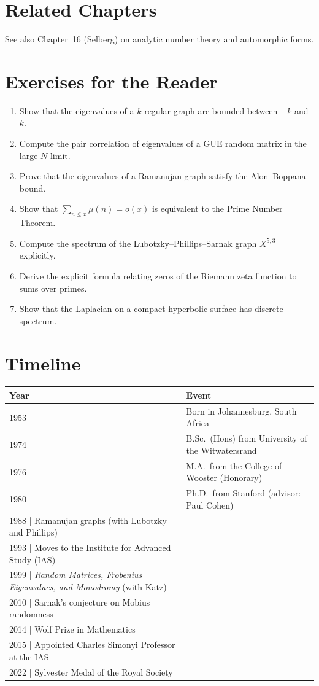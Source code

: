 \section{Related Chapters}
See also Chapter~16 (Selberg) on analytic number theory and automorphic forms.

\section*{Exercises for the Reader}

\begin{enumerate}
    \item [B] Show that the eigenvalues of a $k$-regular graph are bounded between $-k$ and $k$.
    \item [I] Compute the pair correlation of eigenvalues of a GUE random matrix in the large $N$ limit.
    \item [I] Prove that the eigenvalues of a Ramanujan graph satisfy the Alon--Boppana bound.
    \item [I] Show that $\sum_{n \leq x} \mu(n) = o(x)$ is equivalent to the Prime Number Theorem.
    \item [A] Compute the spectrum of the Lubotzky--Phillips--Sarnak graph $X^{5,3}$ explicitly.
    \item [I] Derive the explicit formula relating zeros of the Riemann zeta function to sums over primes.
    \item [I] Show that the Laplacian on a compact hyperbolic surface has discrete spectrum.
\end{enumerate}

\section*{Timeline}

\begin{tabularx}{\linewidth}{|p{1.5cm}|>{\raggedright\arraybackslash}X|}
\hline
\textbf{Year} & \textbf{Event} \\ \hline
1953 & Born in Johannesburg, South Africa \\ \hline
1974 & B.Sc.\ (Hons) from University of the Witwatersrand \\ \hline
1976 & M.A.\ from the College of Wooster (Honorary) \\ \hline
1980 & Ph.D.\ from Stanford (advisor: Paul Cohen) \\ \hline
1988 | Ramanujan graphs (with Lubotzky and Phillips) \\ \hline
1993 | Moves to the Institute for Advanced Study (IAS) \\ \hline
1999 | \textit{Random Matrices, Frobenius Eigenvalues, and Monodromy} (with Katz) \\ \hline
2010 | Sarnak's conjecture on Mobius randomness \\ \hline
2014 | Wolf Prize in Mathematics \\ \hline
2015 | Appointed Charles Simonyi Professor at the IAS \\ \hline
2022 | Sylvester Medal of the Royal Society \\ \hline
\end{tabularx}

